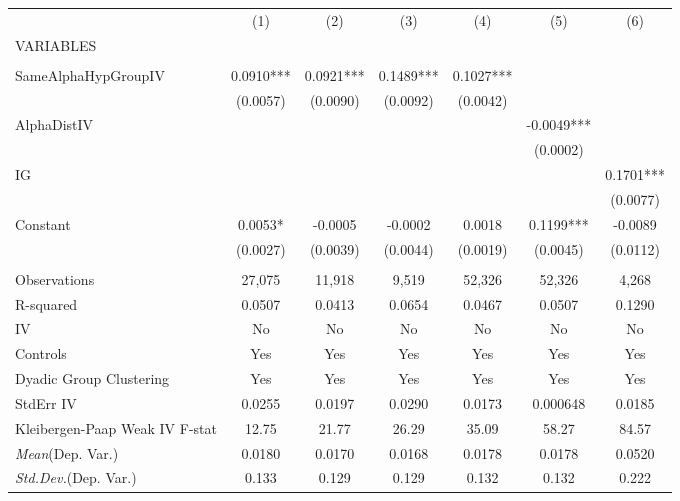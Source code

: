 \documentclass[]{article}
\begin{document}
\begin{tabular}{lcccccc} \hline
 & (1) & (2) & (3) & (4) & (5) & (6) \\
VARIABLES &  &  &  &  &  &  \\ \hline
 &  &  &  &  &  &  \\
SameAlphaHypGroupIV & 0.0910*** & 0.0921*** & 0.1489*** & 0.1027*** &  &  \\
 & (0.0057) & (0.0090) & (0.0092) & (0.0042) &  &  \\
AlphaDistIV &  &  &  &  & -0.0049*** &  \\
 &  &  &  &  & (0.0002) &  \\
IG &  &  &  &  &  & 0.1701*** \\
 &  &  &  &  &  & (0.0077) \\
Constant & 0.0053* & -0.0005 & -0.0002 & 0.0018 & 0.1199*** & -0.0089 \\
 & (0.0027) & (0.0039) & (0.0044) & (0.0019) & (0.0045) & (0.0112) \\
 &  &  &  &  &  &  \\
Observations & 27,075 & 11,918 & 9,519 & 52,326 & 52,326 & 4,268 \\
R-squared & 0.0507 & 0.0413 & 0.0654 & 0.0467 & 0.0507 & 0.1290 \\
IV & No & No & No & No & No & No \\
Controls & Yes & Yes & Yes & Yes & Yes & Yes \\
Dyadic Group Clustering & Yes & Yes & Yes & Yes & Yes & Yes \\
StdErr IV & 0.0255 & 0.0197 & 0.0290 & 0.0173 & 0.000648 & 0.0185 \\
Kleibergen-Paap Weak IV F-stat & 12.75 & 21.77 & 26.29 & 35.09 & 58.27 & 84.57 \\
\textit{Mean}(Dep. Var.) & 0.0180 & 0.0170 & 0.0168 & 0.0178 & 0.0178 & 0.0520 \\
 \textit{Std.Dev.}(Dep. Var.) & 0.133 & 0.129 & 0.129 & 0.132 & 0.132 & 0.222 \\ \hline
\end{tabular}
\end{document}
